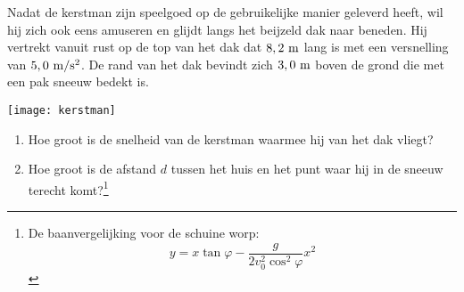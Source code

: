 \begin{exercise} Nadat de kerstman zijn speelgoed op de
gebruikelijke manier geleverd heeft, wil hij zich ook eens amuseren
en glijdt langs het beijzeld dak naar beneden. Hij vertrekt vanuit
rust op de top van het dak dat $8,2~\rm m$ lang is met een
versnelling van $5,0~\rm m/s^2$. De rand van het dak bevindt zich
$3,0~\rm m$ boven de grond die met een pak sneeuw bedekt is.
\begin{center}
\texttt{[image: kerstman]}
\end{center}
\begin{enumerate}
\item Hoe groot is de snelheid van de kerstman waarmee hij van het
dak vliegt?
\item Hoe groot is de afstand $d$ tussen het huis en het punt waar
hij in de sneeuw terecht komt?\footnote{De baanvergelijking voor de
schuine worp:
\[
y=x\tan\varphi-\frac{g}{2v_0^2\cos^2\varphi}x^2
\]}
\end{enumerate}

\end{exercise}


